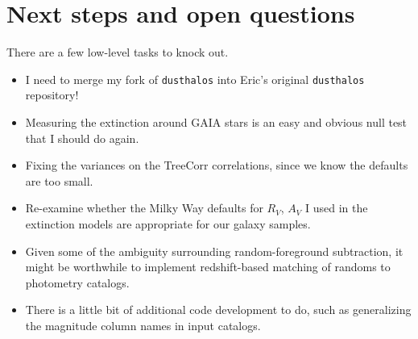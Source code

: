 \documentclass[11pt, oneside]{article}   	%
\begin{document}

\section{Next steps and open questions}\label{sec:next_steps}

There are a few low-level tasks to knock out.  

\begin{itemize}
\item I need to merge my fork of \texttt{dusthalos} into Eric's original \texttt{dusthalos} repository!  
\item Measuring the extinction around GAIA stars is an easy and obvious null test that I should do again.
\item Fixing the variances on the TreeCorr correlations, since we know the defaults are too small.
\item Re-examine whether the Milky Way defaults for $R_V$, $A_V$ I used in the extinction models are appropriate for our galaxy samples.
\item Given some of the ambiguity surrounding random-foreground subtraction, it might be worthwhile to implement redshift-based matching of randoms to photometry catalogs.
\item There is a little bit of additional code development to do, such as generalizing the magnitude column names in input catalogs. 
\end{itemize}
\end{document}

